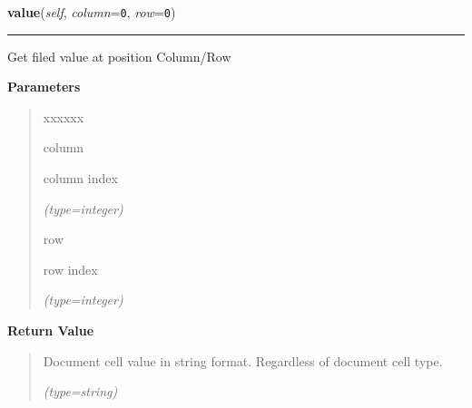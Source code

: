 \hspace{.8\funcindent}\begin{boxedminipage}{\funcwidth}

    \raggedright \textbf{value}(\textit{self}, \textit{column}={\tt 0}, \textit{row}={\tt 0})

    \vspace{-1.5ex}

    \rule{\textwidth}{0.5\fboxrule}
\setlength{\parskip}{2ex}
    Get filed value at position Column/Row

\setlength{\parskip}{1ex}
      \textbf{Parameters}
      \vspace{-1ex}

      \begin{quote}
        \begin{Ventry}{xxxxxx}

          \item[column]

          column index

            {\it (type=integer)}

          \item[row]

          row index

            {\it (type=integer)}

        \end{Ventry}

      \end{quote}

      \textbf{Return Value}
    \vspace{-1ex}

      \begin{quote}
      Document cell value in string format. Regardless of document
      cell type.

      {\it (type=string)}

      \end{quote}

    \end{boxedminipage}

    \label{src:pylibratm:Field:insert_row}

    \vspace{0.5ex}

